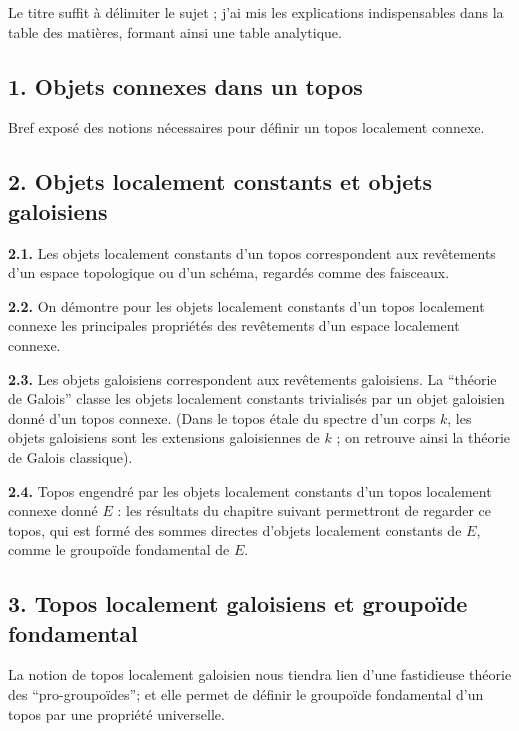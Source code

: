 






Le titre suffit à délimiter le sujet ; j'ai mis les explications indispensables dans la table des matières, formant ainsi une table analytique.

\subsection*{1. Objets connexes dans un topos}

Bref exposé des notions nécessaires pour définir un topos localement connexe.

\subsection*{2. Objets localement constants et objets galoisiens}

{\bf 2.1.} Les objets localement constants d'un topos correspondent aux revêtements d'un espace topologique ou d'un schéma, regardés comme des faisceaux.

{\bf 2.2.} On démontre pour les objets localement constants d'un topos localement connexe les principales propriétés des revêtements d'un espace localement connexe.

{\bf 2.3.} Les objets galoisiens correspondent aux revêtements galoisiens. La ``théorie de Galois'' classe les objets localement constants trivialisés par un objet galoisien donné d'un topos connexe. (Dans le topos étale du spectre d'un corps $k$, les objets galoisiens sont les extensions galoisiennes de $k$ ; on retrouve ainsi la théorie de Galois classique).

{\bf 2.4.} Topos engendré par les objets localement constants d'un topos localement connexe donné $E$ : les résultats du chapitre suivant permettront de regarder ce topos, qui est formé des sommes directes d'objets localement constants de $E$, comme le groupoïde fondamental de $E$.

\subsection*{3. Topos localement galoisiens et groupoïde fondamental}

La notion de topos localement galoisien nous tiendra lien d'une fastidieuse théorie des ``pro-groupoïdes''; et elle permet de définir le groupoïde fondamental d'un topos par une propriété universelle.

